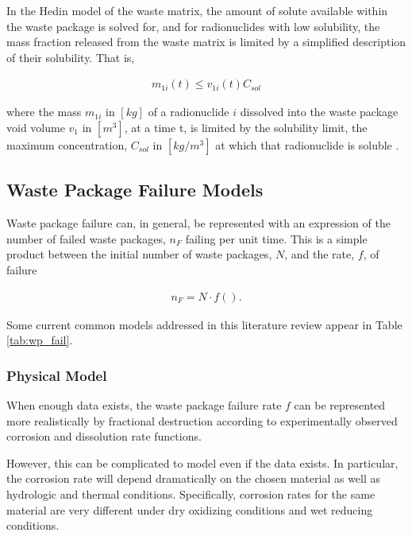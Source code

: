 In the Hedin model of the waste matrix, the amount of solute available within
the waste package is solved for, and for radionuclides with low solubility, the mass
fraction released from the waste matrix is limited by a simplified description
of their solubility. That is, 

\begin{align} 
  m_{1i}(t)\le v_{1i}(t)C_{sol}
\end{align}

where the mass $m_{1i}$ in $[kg]$ of a radionuclide $i$ dissolved into the waste package
void volume $v_1$ in $[m^3]$, at a time t, is limited by the solubility limit, 
the maximum concentration, $C_{sol}$ in $[kg/m^3]$ at which that radionuclide is 
soluble \cite{hedin_integrated_2002}.


\subsection{Waste Package Failure Models}

Waste package failure can, in general, be represented with an expression of the 
number of failed waste packages, $n_F$ failing per unit time. This is a simple 
product between the initial number of waste packages, $N$, and the rate, $f$, of 
failure

\begin{align}
  n_F = N\cdot f().
  \label{rate}
\end{align}

Some current common models addressed in this literature review appear in Table 
\ref{tab:wp_fail}.




\subsubsection{Physical Model}

When enough data exists, the waste package failure rate $f$ can
be represented more realistically by fractional destruction according to
experimentally observed corrosion and dissolution rate functions.

However, this can be complicated to model even if the data exists. In
particular, the corrosion rate will depend dramatically on the chosen material 
as well as hydrologic and thermal conditions. Specifically, corrosion rates for 
the same material are very different under dry oxidizing conditions and wet 
reducing conditions. 

